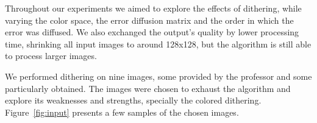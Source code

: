 \documentclass[conference]{IEEEtran}
\begin{document}
Throughout our experiments we aimed to explore the effects of dithering, while varying the color space, the error diffusion matrix and the order in which the error was diffused. We also exchanged the output's quality by lower processing time, shrinking all input images to around 128x128, but the algorithm is still able to process larger images.

We performed dithering on {\color{red}nine} images, some provided by the professor and some particularly obtained. The images were chosen to exhaust the algorithm and explore its weaknesses and strengths, specially the colored dithering. Figure~\ref{fig:input} presents a few samples of the chosen images.

\begin{figure}[H]
	\centering
	\quad
	\quad
	\quad
\end{figure}
\end{document}
